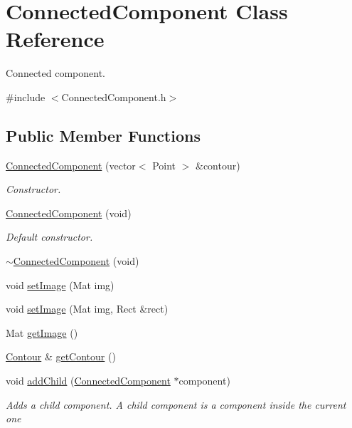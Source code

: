 \hypertarget{class_connected_component}{\section{Connected\+Component Class Reference}
\label{class_connected_component}
}


Connected component.  




{\ttfamily \#include $<$Connected\+Component.\+h$>$}

\subsection*{Public Member Functions}
\begin{DoxyCompactItemize}
\item 
\hyperlink{class_connected_component_a80f5acb7e4c10b17ab1d9dd1e5bbe308}{Connected\+Component} (vector$<$ Point $>$ \&contour)
\begin{DoxyCompactList}\small\item\em Constructor. \end{DoxyCompactList}\item 
\hyperlink{class_connected_component_af69288c391283d9ca4d017d435c840c9}{Connected\+Component} (void)
\begin{DoxyCompactList}\small\item\em Default constructor. \end{DoxyCompactList}\item 
\hyperlink{class_connected_component_a91f368cd2b9c725ba1ef610c0d18e223}{$\sim$\+Connected\+Component} (void)
\item 
void \hyperlink{class_connected_component_ac13a32125f8c05e118dcaa1fd57eacfb}{set\+Image} (Mat img)
\item 
void \hyperlink{class_connected_component_abd451aa4596f6e4bfb2c4b74b1764789}{set\+Image} (Mat img, Rect \&rect)
\item 
Mat \hyperlink{class_connected_component_ad25f944f3627225427501c1a1cd7dc45}{get\+Image} ()
\item 
\hyperlink{class_contour}{Contour} \& \hyperlink{class_connected_component_ae2272acc6e94fc8e2fa7f87e4e17c944}{get\+Contour} ()
\item 
void \hyperlink{class_connected_component_a391767f0886946771bf138e3d136b192}{add\+Child} (\hyperlink{class_connected_component}{Connected\+Component} $\ast$component)
\begin{DoxyCompactList}\small\item\em Adds a child component. A child component is a component inside the current one \end{DoxyCompactList}\item 

\end{DoxyCompactItemize}
